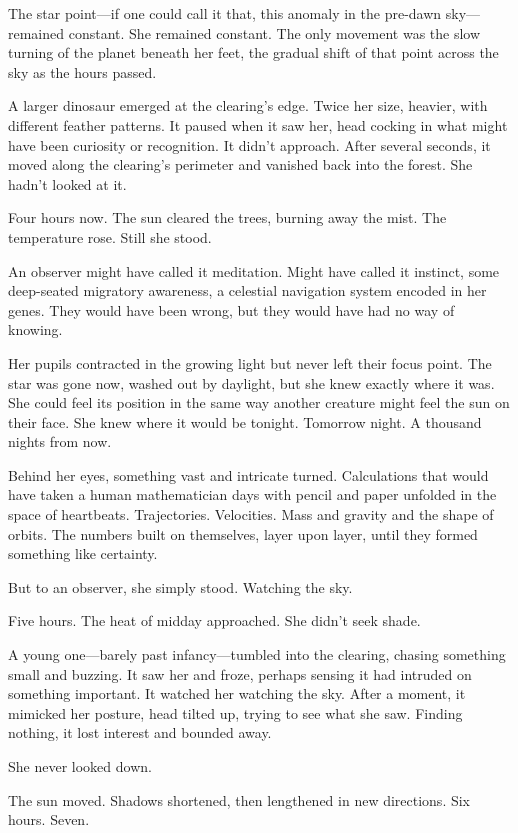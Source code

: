 The star point—if one could call it that, this anomaly in the pre-dawn sky—remained constant. She remained constant. The only movement was the slow turning of the planet beneath her feet, the gradual shift of that point across the sky as the hours passed.

A larger dinosaur emerged at the clearing's edge. Twice her size, heavier, with different feather patterns. It paused when it saw her, head cocking in what might have been curiosity or recognition. It didn't approach. After several seconds, it moved along the clearing's perimeter and vanished back into the forest. She hadn't looked at it.

Four hours now. The sun cleared the trees, burning away the mist. The temperature rose. Still she stood.

An observer might have called it meditation. Might have called it instinct, some deep-seated migratory awareness, a celestial navigation system encoded in her genes. They would have been wrong, but they would have had no way of knowing.

Her pupils contracted in the growing light but never left their focus point. The star was gone now, washed out by daylight, but she knew exactly where it was. She could feel its position in the same way another creature might feel the sun on their face. She knew where it would be tonight. Tomorrow night. A thousand nights from now.

Behind her eyes, something vast and intricate turned. Calculations that would have taken a human mathematician days with pencil and paper unfolded in the space of heartbeats. Trajectories. Velocities. Mass and gravity and the shape of orbits. The numbers built on themselves, layer upon layer, until they formed something like certainty.

But to an observer, she simply stood. Watching the sky.

Five hours. The heat of midday approached. She didn't seek shade.

A young one—barely past infancy—tumbled into the clearing, chasing something small and buzzing. It saw her and froze, perhaps sensing it had intruded on something important. It watched her watching the sky. After a moment, it mimicked her posture, head tilted up, trying to see what she saw. Finding nothing, it lost interest and bounded away.

She never looked down.

The sun moved. Shadows shortened, then lengthened in new directions. Six hours. Seven.

